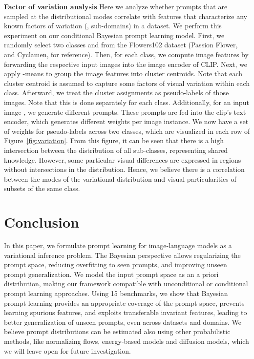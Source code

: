 \documentclass[10pt,twocolumn,letterpaper]{article}
\begin{document}
\textbf{Factor of variation analysis}
Here we analyze whether prompts that are sampled at the distributional modes correlate with features that characterize any known factors of variation (\eg, sub-domains) in a dataset. We perform this experiment on our conditional Bayesian prompt learning model.
First, we randomly select two classes
 and 
from the Flowers102 dataset (Passion Flower, and Cyclamen, for reference). Then, for each class, we compute image features by forwarding the respective input images  into the image encoder of CLIP. Next, we apply -means to group the image features into  cluster centroids. Note that each cluster centroid is assumed to capture some factors of visual variation within each class. Afterward, we treat the cluster assignments as pseudo-labels of those images. Note that this is done separately for each class. Additionally, for an input image , we generate  different prompts. These prompts are fed into the clip's text encoder, which generates  different weights  per image instance. We now have a set of  weights for  pseudo-labels across two classes, which are visualized in each row of Figure~\ref{fig:variation}. 
From this figure, it can be seen that there is a high intersection between the distribution of all sub-classes, representing shared knowledge. However, some particular visual differences are expressed in regions without intersections in the distribution. Hence, we believe there is a correlation between the modes of the variational distribution and visual particularities of subsets of the same class. 



 \section{Conclusion}
\vspace{-0.5em}

In this paper, we formulate prompt learning for image-language models as a variational inference problem. The Bayesian perspective allows regularizing the prompt space, reducing overfitting to seen prompts, and improving unseen prompt generalization. We model the input prompt space as an a priori distribution, making our framework compatible with unconditional or conditional prompt learning approaches. Using 15 benchmarks, we show that Bayesian prompt learning provides an appropriate coverage of the prompt space, prevents learning spurious features, and exploits transferable invariant features, leading to better generalization of unseen prompts, even across datasets and domains.
We believe prompt distributions can be estimated also using other probabilistic methods, like normalizing flows, energy-based models and diffusion models, 
which we will leave open for future investigation. 
\end{document}
